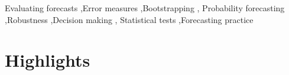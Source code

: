 \documentclass[11pt,3p,review,authoryear]{elsarticle}
\theoremstyle{definition}
\begin{document}
\begin{frontmatter}
\begin{keyword}
Evaluating forecasts \sep Error measures \sep Bootstrapping \sep
Probability forecasting \sep Robustness \sep Decision making \sep
Statistical tests \sep Forecasting practice
\end{keyword}

\end{frontmatter}
\section*{Highlights}
\begin{itemize}\itemsep0pt
\highlightsList{}
\end{itemize}
\end{document}
